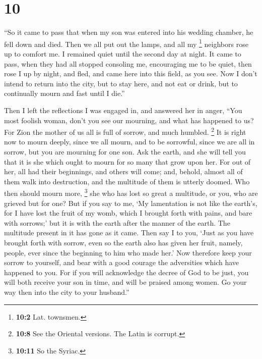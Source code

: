 \hypertarget{section-9}{%
\section{10}\label{section-9}}

 ``So it came to pass that when my son was entered into
his wedding chamber, he fell down and died.  Then we all
put out the lamps, and all my \footnote{\textbf{10:2} Lat. townsmen.}
neighbors rose up to comfort me. I remained quiet until the second day
at night.  It came to pass, when they had all stopped
consoling me, encouraging me to be quiet, then rose I up by night, and
fled, and came here into this field, as you see.  Now I
don't intend to return into the city, but to stay here, and not eat or
drink, but to continually mourn and fast until I die.''

 Then I left the reflections I was engaged in, and
answered her in anger,  ``You most foolish woman, don't
you see our mourning, and what has happened to us?  For
Zion the mother of us all is full of sorrow, and much humbled.
 \footnote{\textbf{10:8} See the Oriental versions. The
  Latin is corrupt.} It is right now to mourn deeply, since we all
mourn, and to be sorrowful, since we are all in sorrow, but you are
mourning for one son.  Ask the earth, and she will tell
you that it is she which ought to mourn for so many that grow upon her.
 For out of her, all had their beginnings, and others
will come; and, behold, almost all of them walk into destruction, and
the multitude of them is utterly doomed.  Who then should
mourn more, \footnote{\textbf{10:11} So the Syriac.} she who has lost so
great a multitude, or you, who are grieved but for one? 
But if you say to me, `My lamentation is not like the earth's, for I
have lost the fruit of my womb, which I brought forth with pains, and
bare with sorrows;'  but it is with the earth after the
manner of the earth. The multitude present in it has gone as it came.
 Then say I to you, `Just as you have brought forth with
sorrow, even so the earth also has given her fruit, namely, people, ever
since the beginning to him who made her.'  Now therefore
keep your sorrow to yourself, and bear with a good courage the
adversities which have happened to you.  For if you will
acknowledge the decree of God to be just, you will both receive your son
in time, and will be praised among women.  Go your way
then into the city to your husband.''

